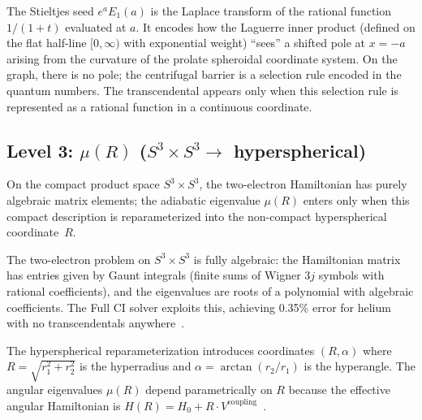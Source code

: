 \documentclass[aps,pra,twocolumn,superscriptaddress,longbibliography]{revtex4-2}
\begin{document}
The Stieltjes seed $e^a E_1(a)$ is the Laplace transform of the
rational function $1/(1+t)$ evaluated at $a$.  It encodes how
the Laguerre inner product (defined on the flat half-line
$[0, \infty)$ with exponential weight) ``sees'' a shifted pole
at $x = -a$ arising from the curvature of the prolate spheroidal
coordinate system.  On the graph, there is no pole; the
centrifugal barrier is a selection rule encoded in the quantum
numbers.  The transcendental appears only when this selection
rule is represented as a rational function in a continuous
coordinate.

\subsection{Level 3: $\mu(R)$ ($S^3 \times S^3 \to$ hyperspherical)}
\label{sec:mu}

On the compact product space $S^3 \times S^3$, the two-electron
Hamiltonian has purely algebraic matrix elements; the adiabatic
eigenvalue $\mu(R)$ enters only when this compact description is
reparameterized into the non-compact hyperspherical coordinate~$R$.

The two-electron problem on $S^3 \times S^3$ is fully algebraic:
the Hamiltonian matrix has entries given by Gaunt integrals
(finite sums of Wigner $3j$ symbols with rational coefficients),
and the eigenvalues are roots of a polynomial with algebraic
coefficients.  The Full CI solver exploits this, achieving
0.35\% error for helium with no transcendentals
anywhere~\cite{loutey_fci}.

The hyperspherical reparameterization introduces coordinates
$(R, \alpha)$ where $R = \sqrt{r_1^2 + r_2^2}$ is the
hyperradius and $\alpha = \arctan(r_2/r_1)$ is the hyperangle.
The angular eigenvalues $\mu(R)$ depend parametrically on $R$
because the effective angular Hamiltonian is
$H(R) = H_0 + R \cdot V^{\mathrm{coupling}}$~\cite{loutey_paper13}.
\end{document}
